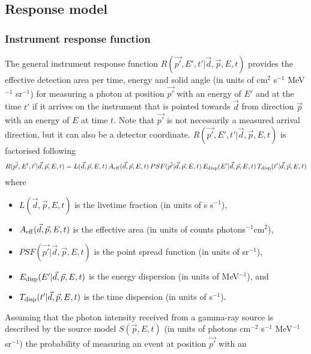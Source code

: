 \documentclass{article}[12pt,a4]
\begin{document}
\subsection{Response model}

\subsubsection{Instrument response function}

The general instrument response function
$R(\vec{p'}, E', t' | \vec{d}, \vec{p}, E, t)$
provides the effective detection area per time, energy and solid angle
(in units of cm$^2$ s$^{-1}$ MeV$^{-1}$ sr$^{-1}$) 
for measuring a photon at position $\vec{p'}$ with an energy of $E'$ and at the time $t'$ if it 
arrives on the instrument that is pointed towards $\vec{d}$ from direction $\vec{p}$ with an 
energy of $E$ at time $t$.
Note that $\vec{p'}$ is not necessarily a measured arrival direction, but it can also be
a detector coordinate.
$R(\vec{p'}, E', t' | \vec{d}, \vec{p}, E, t)$ is factorised following
\begin{eqnarray}
R(\vec{p'}, E', t' | \vec{d}, \vec{p}, E, t) = 
  L(\vec{d}, \vec{p}, E, t) \,
  A_{\rm eff}(\vec{d}, \vec{p}, E, t) \,
  PSF(\vec{p'} | \vec{d}, \vec{p}, E, t) \,
  E_{\rm disp}(E' | \vec{d}, \vec{p}, E, t) \,
  T_{\rm disp}(t' | \vec{d}, \vec{p}, E, t)
\label{eq:rspfact}
\end{eqnarray}
where
\begin{itemize}
\item $L(\vec{d}, \vec{p}, E, t)$ is the livetime fraction (in units of s s$^{-1}$),
\item $A_{\rm eff}(\vec{d}, \vec{p}, E, t)$ is the effective area (in units of counts photons$^{-1}$cm$^2$),
\item $PSF(\vec{p'} | \vec{d}, \vec{p}, E, t)$ is the point spread function (in units of sr$^{-1}$),
\item $E_{\rm disp}(E' | \vec{d}, \vec{p}, E, t)$ is the energy dispersion (in units of MeV$^{-1}$), and
\item $T_{\rm disp}(t' | \vec{d}, \vec{p}, E, t)$ is the time dispersion (in units of s$^{-1}$).
\end{itemize}
Assuming that the photon intensity received from a gamma-ray source is described by
the source model $S(\vec{p}, E, t)$ (in units of photons cm$^{-2}$ s$^{-1}$ MeV$^{-1}$ sr$^{-1}$)
the probability of measuring an event at position $\vec{p'}$ with an
\end{document}
